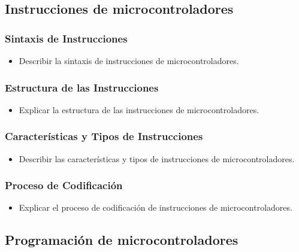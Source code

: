 \documentclass[a4paper,12pt]{article}
\begin{document}
	
	\subsection{Instrucciones de microcontroladores}
	\subsubsection{Sintaxis de Instrucciones}
	\begin{itemize}
		\item Describir la sintaxis de instrucciones de microcontroladores.
	\end{itemize}
	\subsubsection{Estructura de las Instrucciones}
	\begin{itemize}
		\item Explicar la estructura de las instrucciones de microcontroladores.
	\end{itemize}
	\subsubsection{Características y Tipos de Instrucciones}
	\begin{itemize}
		\item Describir las características y tipos de instrucciones de microcontroladores.
	\end{itemize}
	\subsubsection{Proceso de Codificación}
	\begin{itemize}
		\item Explicar el proceso de codificación de instrucciones de microcontroladores.
	\end{itemize}
	
	\subsection{Programación de microcontroladores}
\end{document}

